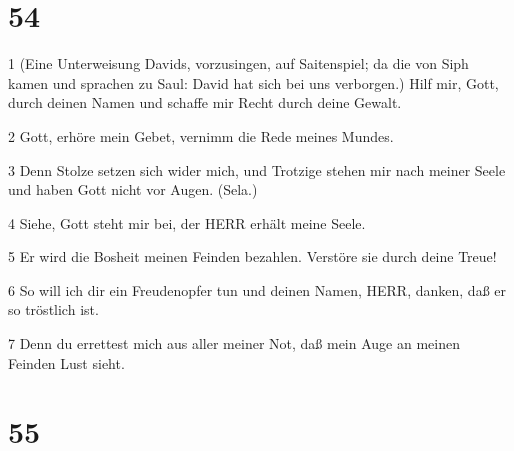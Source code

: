 \chapter{54}

\par 1 (Eine Unterweisung Davids, vorzusingen, auf Saitenspiel; da die von Siph kamen und sprachen zu Saul: David hat sich bei uns verborgen.) Hilf mir, Gott, durch deinen Namen und schaffe mir Recht durch deine Gewalt.
\par 2 Gott, erhöre mein Gebet, vernimm die Rede meines Mundes.
\par 3 Denn Stolze setzen sich wider mich, und Trotzige stehen mir nach meiner Seele und haben Gott nicht vor Augen. (Sela.)
\par 4 Siehe, Gott steht mir bei, der HERR erhält meine Seele.
\par 5 Er wird die Bosheit meinen Feinden bezahlen. Verstöre sie durch deine Treue!
\par 6 So will ich dir ein Freudenopfer tun und deinen Namen, HERR, danken, daß er so tröstlich ist.
\par 7 Denn du errettest mich aus aller meiner Not, daß mein Auge an meinen Feinden Lust sieht.

\chapter{55}

